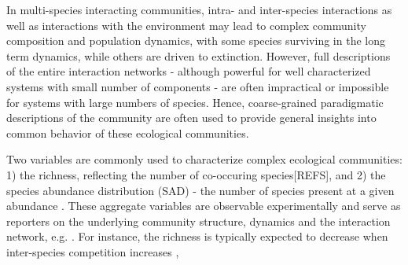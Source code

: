 \documentclass[9pt,twocolumn,twoside,lineno]{pnas-new}
\begin{document}
In multi-species interacting communities,  intra- and inter-species interactions as well as interactions with the environment may lead to complex community composition and population dynamics, with some species surviving in the long term dynamics, while others are driven to extinction.
However, full descriptions of the entire interaction networks - although powerful for well characterized systems with small number of components - are often impractical or impossible for systems with large numbers of species. 
Hence, coarse-grained paradigmatic descriptions of the community are often used to provide general insights into common behavior of these ecological communities.

Two variables are commonly used to characterize complex ecological communities: 1) the richness, reflecting the number of co-occuring species\cite{capitan2017stochastic}[REFS], and 2) the species abundance distribution (SAD) - the number of species present at a given abundance \cite{nias1968clone, rulands2018universality, de2020naive, mcgill2007species, matthews2015species}. %
These aggregate variables are observable experimentally and serve as reporters on the underlying community structure, dynamics and the interaction network, e.g. \cite{rahbek2001multiscale,hong2006predicting,adler2011productivity,valencia2020synchrony}. 
For instance, the richness is typically expected to decrease when inter-species competition increases  \cite{capitan2017stochastic}, 
\end{document}
